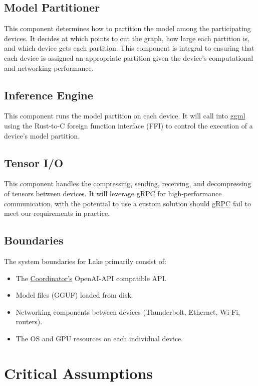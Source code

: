 \documentclass{article}
\begin{document}
\subsection{Model Partitioner}
This component determines how to partition the model among the participating devices. It
decides at which points to cut the graph, how large each partition is, and which device gets
each partition. This component is integral to ensuring that each device is assigned an appropriate
partition given the device's computational and networking performance.

\subsection{Inference Engine}
This component runs the model partition on each device. It will call into
\href{https://github.com/ggml-org/ggml}{ggml} using the Rust-to-C foreign function interface (FFI) to control the execution of a
device's model partition.

\subsection{Tensor I/O}
This component handles the compressing, sending, receiving, and decompressing of tensors between devices.
It will leverage \href{https://grpc.io/}{gRPC} for high-performance communication, with the potential
to use a custom solution should \href{https://grpc.io/}{gRPC} fail to meet our requirements in practice.

\subsection{Boundaries}
The system boundaries for Lake primarily consist of:
\begin{itemize}
	\item The \hyperref[subsec:coordinator]{Coordinator's} OpenAI-API compatible API.
	\item Model files (GGUF) loaded from disk.
	\item Networking components between devices (Thunderbolt, Ethernet, Wi-Fi, routers).
	\item The OS and GPU resources on each individual device.
\end{itemize}

\section{Critical Assumptions}
\label{SecAssumptions}
\end{document}
